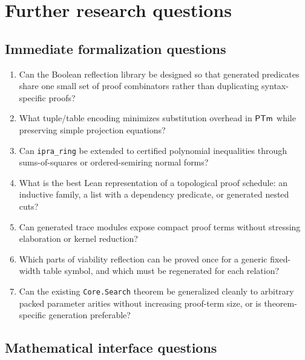 \section{Further research questions}\label{sec:research}

\subsection{Immediate formalization questions}

\begin{enumerate}[label=\textbf{R\arabic*.}]
  \item Can the Boolean reflection library be designed so that generated predicates share one small set of proof combinators rather than duplicating syntax-specific proofs?
  \item What tuple/table encoding minimizes substitution overhead in \(\mathsf{PTm}\) while preserving simple projection equations?
  \item Can \texttt{ipra\_ring} be extended to certified polynomial inequalities through sums-of-squares or ordered-semiring normal forms?
  \item What is the best Lean representation of a topological proof schedule: an inductive family, a list with a dependency predicate, or generated nested cuts?
  \item Can generated trace modules expose compact proof terms without stressing elaboration or kernel reduction?
  \item Which parts of viability reflection can be proved once for a generic fixed-width table symbol, and which must be regenerated for each relation?
  \item Can the existing \texttt{Core.Search} theorem be generalized cleanly to arbitrary packed parameter arities without increasing proof-term size, or is theorem-specific generation preferable?
\end{enumerate}

\subsection{Mathematical interface questions}

